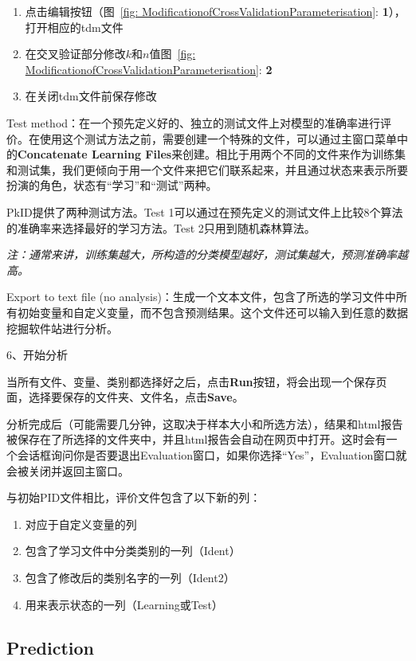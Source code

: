 \documentclass[12pt]{article}
\begin{document}
\begin{enumerate}
\item 点击编辑按钮（图~\ref{fig: ModificationofCrossValidationParameterisation}: {\color{red}\textbf{1}}），打开相应的tdm文件
\item 在交叉验证部分修改$k$和$n$值图~\ref{fig: ModificationofCrossValidationParameterisation}: {\color{red}\textbf{2}}
\item 在关闭tdm文件前保存修改
\end{enumerate}

{\color{red}Test method}：在一个预先定义好的、独立的测试文件上对模型的准确率进行评价。在使用这个测试方法之前，需要创建一个特殊的文件，可以通过主窗口菜单中的\textbf{Concatenate Learning Files}来创建。相比于用两个不同的文件来作为训练集和测试集，我们更倾向于用一个文件来把它们联系起来，并且通过状态来表示所要扮演的角色，状态有“学习”和“测试”两种。

PkID提供了两种测试方法。Test 1可以通过在预先定义的测试文件上比较8个算法的准确率来选择最好的学习方法。Test 2只用到随机森林算法。

{\color{blue}\textit{注：通常来讲，训练集越大，所构造的分类模型越好，测试集越大，预测准确率越高。}}

{\color{red}Export to text file (no analysis)}：生成一个文本文件，包含了所选的学习文件中所有初始变量和自定义变量，而不包含预测结果。这个文件还可以输入到任意的数据挖掘软件站进行分析。

6、开始分析

当所有文件、变量、类别都选择好之后，点击\textbf{Run}按钮，将会出现一个保存页面，选择要保存的文件夹、文件名，点击\textbf{Save}。

分析完成后（可能需要几分钟，这取决于样本大小和所选方法），结果和html报告被保存在了所选择的文件夹中，并且html报告会自动在网页中打开。这时会有一个会话框询问你是否要退出Evaluation窗口，如果你选择“Yes”，Evaluation窗口就会被关闭并返回主窗口。

与初始PID文件相比，评价文件包含了以下新的列：
\begin{enumerate}
\item 对应于自定义变量的列
\item 包含了学习文件中分类类别的一列（Ident）
\item 包含了修改后的类别名字的一列（Ident2）
\item 用来表示状态的一列（Learning或Test）
\end{enumerate}

\subsection{Prediction}
\end{document}
